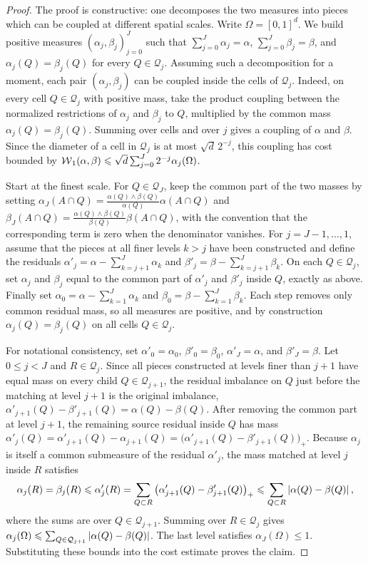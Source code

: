 \begin{proof}
The proof is constructive: one decomposes the two measures into pieces which can be coupled at different spatial scales. Write \(\Omega=[0,1]^d\). We build positive measures \((\alpha_j,\beta_j)_{j=0}^J\) such that \(\sum_{j=0}^J\alpha_j=\alpha\), \(\sum_{j=0}^J\beta_j=\beta\), and \(\alpha_j(Q)=\beta_j(Q)\) for every \(Q\in\mathcal Q_j\).
Assuming such a decomposition for a moment, each pair \((\alpha_j,\beta_j)\) can be coupled inside the cells of \(\mathcal Q_j\). Indeed, on every cell \(Q\in\mathcal Q_j\) with positive mass, take the product coupling between the normalized restrictions of \(\alpha_j\) and \(\beta_j\) to \(Q\), multiplied by the common mass \(\alpha_j(Q)=\beta_j(Q)\). Summing over cells and over \(j\) gives a coupling of \(\alpha\) and \(\beta\). Since the diameter of a cell in \(\mathcal Q_j\) is at most \(\sqrt d\,2^{-j}\), this coupling has cost bounded by
$\operatorname{\mathcal{W}}_1(\alpha,\beta) \leqslant \sqrt d\sum_{j=0}^J2^{-j}\alpha_j(\Omega)$.

Start at the finest scale. For \(Q\in\mathcal Q_J\), keep the common part of the two masses by setting \(\alpha_J(A\cap Q)=\frac{\alpha(Q)\wedge\beta(Q)}{\alpha(Q)}\alpha(A\cap Q)\) and \(\beta_J(A\cap Q)=\frac{\alpha(Q)\wedge\beta(Q)}{\beta(Q)}\beta(A\cap Q)\), with the convention that the corresponding term is zero when the denominator vanishes. For \(j=J-1,\ldots,1\), assume that the pieces at all finer levels \(k>j\) have been constructed and define the residuals \(\alpha'_j=\alpha-\sum_{k=j+1}^J\alpha_k\) and \(\beta'_j=\beta-\sum_{k=j+1}^J\beta_k\).
On each \(Q\in\mathcal Q_j\), set \(\alpha_j\) and \(\beta_j\) equal to the common part of \(\alpha'_j\) and \(\beta'_j\) inside \(Q\), exactly as above. Finally set \(\alpha_0=\alpha-\sum_{k=1}^J\alpha_k\) and \(\beta_0=\beta-\sum_{k=1}^J\beta_k\). Each step removes only common residual mass, so all measures are positive, and by construction \(\alpha_j(Q)=\beta_j(Q)\) on all cells \(Q\in\mathcal Q_j\).

For notational consistency, set \(\alpha'_0=\alpha_0\), \(\beta'_0=\beta_0\), \(\alpha'_J=\alpha\), and \(\beta'_J=\beta\). Let \(0\leq j<J\) and \(R\in\mathcal Q_j\). Since all pieces constructed at levels finer than \(j+1\) have equal mass on every child \(Q\in\mathcal Q_{j+1}\), the residual imbalance on \(Q\) just before the matching at level \(j+1\) is the original imbalance, \(\alpha'_{j+1}(Q)-\beta'_{j+1}(Q)=\alpha(Q)-\beta(Q)\).
After removing the common part at level \(j+1\), the remaining source residual inside \(Q\) has mass
$\alpha'_j(Q) = \alpha'_{j+1}(Q)-\alpha_{j+1}(Q) = \big(\alpha'_{j+1}(Q)-\beta'_{j+1}(Q)\big)_+$.
Because \(\alpha_j\) is itself a common submeasure of the residual \(\alpha'_j\), the mass matched at level \(j\) inside \(R\) satisfies
\[
\alpha_j(R)=\beta_j(R)
\leqslant \alpha'_j(R)
=
\sum_{Q\subset R}
\big(\alpha'_{j+1}(Q)-\beta'_{j+1}(Q)\big)_+
\leqslant
\sum_{Q\subset R}
\left\lvert\alpha(Q)-\beta(Q)\right\rvert,
\]
where the sums are over \(Q\in\mathcal Q_{j+1}\). Summing over \(R\in\mathcal Q_j\) gives
$\alpha_j(\Omega) \leqslant \sum_{Q\in\mathcal Q_{j+1}}\left\lvert\alpha(Q)-\beta(Q)\right\rvert$.
The last level satisfies \(\alpha_J(\Omega)\leq1\). Substituting these bounds into the cost estimate proves the claim.
\end{proof}
